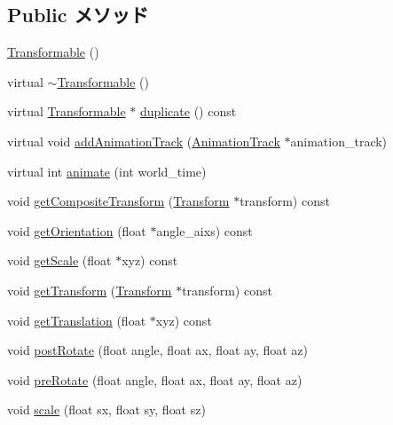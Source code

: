 \subsection*{Public メソッド}
\begin{CompactItemize}
\item 
\hyperlink{classm3g_1_1Transformable_ca6563203e3e883391c9d0927028aa04}{Transformable} ()
\item 
virtual \hyperlink{classm3g_1_1Transformable_89d9c7912ed11a30a312fd8f72b9ab22}{$\sim$Transformable} ()
\item 
virtual \hyperlink{classm3g_1_1Transformable}{Transformable} $\ast$ \hyperlink{classm3g_1_1Transformable_4f64f95a34c56cb1553dc6de660dff6f}{duplicate} () const 
\item 
virtual void \hyperlink{classm3g_1_1Transformable_415c0b110f95410ded9b85e5d99a496b}{addAnimationTrack} (\hyperlink{classm3g_1_1AnimationTrack}{AnimationTrack} $\ast$animation\_\-track)
\item 
virtual int \hyperlink{classm3g_1_1Transformable_8aad1ceab4c2a03609c8a42324ce484d}{animate} (int world\_\-time)
\item 
void \hyperlink{classm3g_1_1Transformable_263ef66efed11b7f9678e2e4bbec4c55}{getCompositeTransform} (\hyperlink{classm3g_1_1Transform}{Transform} $\ast$transform) const 
\item 
void \hyperlink{classm3g_1_1Transformable_06125ab0d85ef8c5c7ace9ced04993f3}{getOrientation} (float $\ast$angle\_\-aixs) const 
\item 
void \hyperlink{classm3g_1_1Transformable_b8a2dd11d0ba90e138625eb86a6a6083}{getScale} (float $\ast$xyz) const 
\item 
void \hyperlink{classm3g_1_1Transformable_73f387f99c527b382c8aaa54b8af6ed6}{getTransform} (\hyperlink{classm3g_1_1Transform}{Transform} $\ast$transform) const 
\item 
void \hyperlink{classm3g_1_1Transformable_d8aec42959fecc3d76f9539d3afa3c8d}{getTranslation} (float $\ast$xyz) const 
\item 
void \hyperlink{classm3g_1_1Transformable_4abf135257f132cdf9580f3a3e11ea6c}{postRotate} (float angle, float ax, float ay, float az)
\item 
void \hyperlink{classm3g_1_1Transformable_718b606184672eec83263ad44d5c7431}{preRotate} (float angle, float ax, float ay, float az)
\item 
void \hyperlink{classm3g_1_1Transformable_d94deaf828db5e2dfd5e40db42b64cd9}{scale} (float sx, float sy, float sz)
\item 

\end{CompactItemize}
